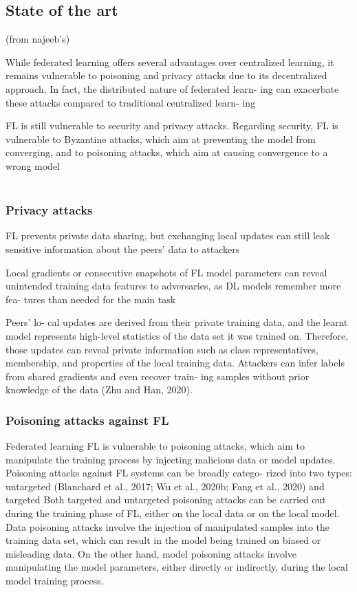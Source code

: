 \subsection{State of the art} \label{sec:state_of_the_art}
(from najeeb's)

While federated learning offers several advantages over centralized learning, 
it remains vulnerable to poisoning and privacy attacks due to its decentralized 
approach. In fact, the distributed nature of federated learn- ing can 
exacerbate these attacks compared to traditional centralized learn- ing

FL is still vulnerable to security and privacy attacks. Regarding security, FL is vulnerable to Byzantine attacks, which aim at preventing the model from converging, and to poisoning attacks, which aim at causing convergence to a wrong model \\\\

\subsubsection{Privacy attacks}
FL prevents private data sharing, but exchanging local updates can still leak 
sensitive information about the peers’ data to attackers

Local gradients or consecutive snapshots of FL model parameters can reveal 
unintended training data features to adversaries, as DL models remember more 
fea- tures than needed for the main task

Peers’ lo- cal updates are derived from their private training data, and the 
learnt model represents high-level statistics of the data set it was trained 
on. Therefore, those updates can reveal private information such as class 
representatives, membership, and properties of the local training data. 
Attackers can infer labels from shared gradients and even recover train- ing 
samples without prior knowledge of the data (Zhu and Han, 2020).



\subsubsection{Poisoning attacks against FL}



Federated learning FL is vulnerable to poisoning attacks, which aim to 
manipulate the training process by injecting malicious data or model updates. 
Poisoning attacks against FL systems can be broadly catego- rized into two 
types: untargeted (Blanchard et al., 2017; Wu et al., 2020b; Fang et al., 2020) 
and targeted 
Both targeted and untargeted poisoning attacks can be carried out during the 
training phase of FL, either on the local data or on the local model. Data 
poisoning attacks involve the injection of manipulated samples into the training 
data set, which can result in the model being trained on biased or misleading data. 
On the other hand, model poisoning attacks involve manipulating the model 
parameters, either directly or indirectly, during the local model training 
process.








